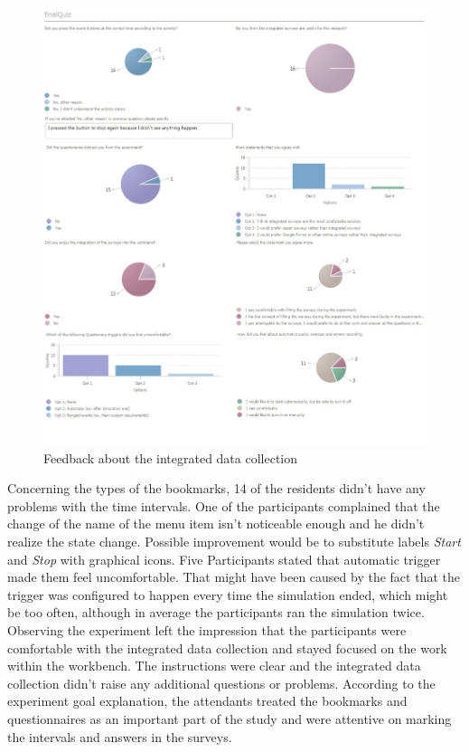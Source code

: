\begin{figure}[htb]
 \centering
\includegraphics[width=\textwidth]{figures/final_qiz.jpg}
\caption{Feedback about the integrated data collection}
\label{fig:final_qiz}
\end{figure}

Concerning the types of the bookmarks, 14 of the residents didn't have any problems with the time intervals. One of the participants complained that the change of the name of the menu item isn't noticeable enough and he didn't realize the state change. Possible improvement would be to substitute labels \textit{Start} and \textit{Stop} with graphical icons. Five Participants stated that automatic trigger made them feel uncomfortable. That might have been caused by the fact that the trigger was configured to happen every time the simulation ended, which might be too often, although in average the participants ran the simulation twice.\\

Observing the experiment left the impression that the participants were comfortable with the integrated data collection and stayed focused on the work within the workbench. The instructions were clear and the integrated data collection didn't raise any additional questions or problems. According to the experiment goal explanation, the attendants treated the bookmarks and questionnaires as an important part of the study and were attentive on marking the intervals and answers in the surveys.\\ 


